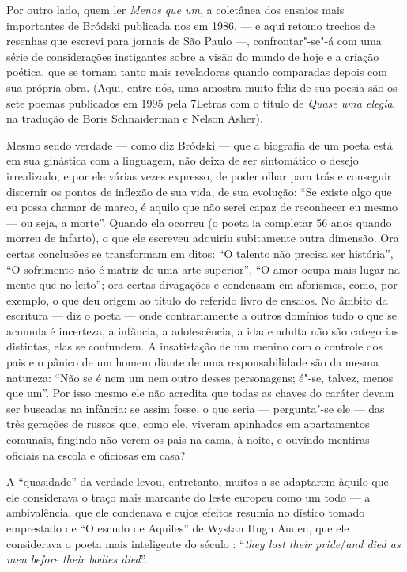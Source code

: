 Por outro lado, quem ler \emph{Menos que um}, a coletânea dos ensaios
mais importantes de Bródski publicada nos  em 1986, --- e aqui
retomo trechos de resenhas que escrevi para jornais de São Paulo ---,
confrontar"-se"-á com uma série de considerações instigantes sobre a visão
do mundo de hoje e a criação poética, que se tornam tanto mais
reveladoras quando comparadas depois com sua própria obra. (Aqui, entre
nós, uma amostra muito feliz de sua poesia são os sete poemas publicados
em 1995 pela 7Letras com o título de \emph{Quase uma elegia}, na
tradução de Boris Schnaiderman e Nelson Asher).

Mesmo sendo verdade --- como diz Bródski --- que a biografia de um poeta
está em sua ginástica com a linguagem, não deixa de ser sintomático o
desejo irrealizado, e por ele várias vezes expresso, de poder olhar para
trás e conseguir discernir os pontos de inflexão de sua vida, de sua
evolução: ``Se existe algo que eu possa chamar de marco, é aquilo que
não serei capaz de reconhecer eu mesmo --- ou seja, a morte''. Quando ela
ocorreu (o poeta ia completar 56 anos quando morreu de infarto), o que
ele escreveu adquiriu subitamente outra dimensão. Ora certas conclusões
se transformam em ditos: ``O talento não precisa ser história'', ``O
sofrimento não é matriz de uma arte superior'', ``O amor ocupa mais
lugar na mente que no leito''; ora certas divagações e condensam em
aforismos, como, por exemplo, o que deu origem ao título do referido
livro de ensaios. No âmbito da escritura --- diz o poeta --- onde
contrariamente a outros domínios tudo o que se acumula é incerteza, a
infância, a adolescência, a idade adulta não são categorias distintas,
elas se confundem. A insatisfação de um menino com o controle dos pais e
o pânico de um homem diante de uma responsabilidade são da mesma
natureza: ``Não se é nem um nem outro desses personagens; é"-se, talvez,
menos que um''. Por isso mesmo ele não acredita que todas as chaves do
caráter devam ser buscadas na infância: se assim fosse, o que seria ---
pergunta"-se ele --- das três gerações de russos que, como ele, viveram
apinhados em apartamentos comunais, fingindo não verem os pais na cama,
à noite, e ouvindo mentiras oficiais na escola e oficiosas em casa?

A ``quasidade'' da verdade levou, entretanto, muitos a se adaptarem
àquilo que ele considerava o traço mais marcante do leste europeu como
um todo --- a ambivalência, que ele condenava e cujos efeitos resumia no
dístico tomado emprestado de ``O escudo de Aquiles'' de Wystan Hugh
Auden, que ele considerava o poeta mais inteligente do século :
``\emph{they lost their pride}/\emph{and died as men before their
bodies died}''.

